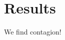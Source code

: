 \documentclass[/../base.tex]{subfiles}
\begin{document}
\section{Results}
\label{results}

We find contagion!
\end{document}
